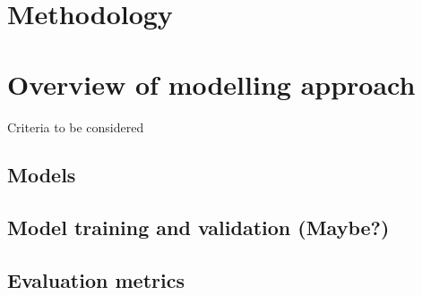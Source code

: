 \section{Methodology}
\section{Overview of modelling approach}
Criteria to be considered

\subsection{Models}

\subsection{Model training and validation (Maybe?)}

\subsection{Evaluation metrics}

